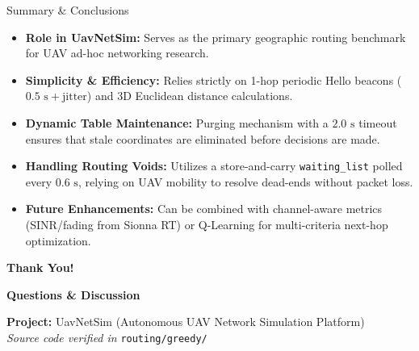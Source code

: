 \documentclass[aspectratio=169,10pt]{beamer}
\begin{document}
\begin{frame}{Summary \& Conclusions}
  \begin{itemize}\setlength{\itemsep}{0.4em}
    \item \textbf{Role in UavNetSim:} Serves as the primary geographic routing benchmark for UAV ad-hoc networking research.
    \item \textbf{Simplicity \& Efficiency:} Relies strictly on 1-hop periodic Hello beacons ($0.5\text{ s} + \text{jitter}$) and 3D Euclidean distance calculations.
    \item \textbf{Dynamic Table Maintenance:} Purging mechanism with a $2.0\text{ s}$ timeout ensures that stale coordinates are eliminated before decisions are made.
    \item \textbf{Handling Routing Voids:} Utilizes a store-and-carry \texttt{waiting\_list} polled every $0.6\text{ s}$, relying on UAV mobility to resolve dead-ends without packet loss.
    \item \textbf{Future Enhancements:} Can be combined with channel-aware metrics (SINR/fading from Sionna RT) or Q-Learning for multi-criteria next-hop optimization.
  \end{itemize}
\end{frame}

\begin{frame}
  \begin{center}
    \Huge \textbf{\textcolor{primary}{Thank You!}}

    \vspace{1.0em}
    \Large \textbf{\textcolor{secondary}{Questions \& Discussion}}

    \vspace{1.5em}
    \normalsize
    \textbf{Project:} UavNetSim (Autonomous UAV Network Simulation Platform) \\
    \textit{Source code verified in} \texttt{routing/greedy/}
  \end{center}
\end{frame}
\end{document}
